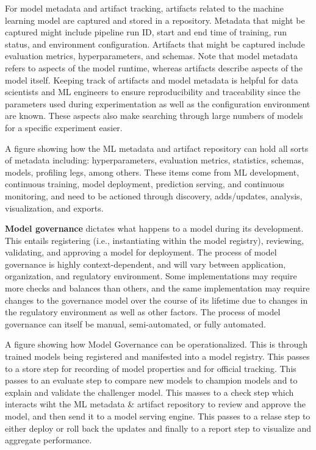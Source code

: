 {{{{{{{{    For model metadata and artifact tracking, artifacts related to the machine learning model are captured and stored in a repository. Metadata that might be captured might include pipeline run  ID, start and end time of training, run status, and environment configuration. Artifacts that might be captured include evaluation metrics, hyperparameters, and schemas. Note that model metadata refers to aspects of the model runtime, whereas artifacts describe aspects of the  model itself. Keeping track of artifacts and model metadata is helpful for data scientists and ML engineers to ensure reproducibility and traceability since the parameters used during experimentation as well as the configuration environment are known. These aspects also make searching through large numbers of models for a specific experiment easier.
    
    
    A figure showing how the ML metadata and artifact repository can hold all sorts of metadata including: hyperparameters, evaluation metrics, statistics, schemas, models, profiling legs, among others. These items come from ML development, continuous training, model deployment, prediction serving, and continuous monitoring, and need to be actioned through discovery, adds/updates, analysis, visualization, and exports.
    
    \textbf{Model governance} dictates what happens to a model during its development. This entails registering (i.e., instantiating within the model registry), reviewing, validating, and approving a model for deployment. The process of model governance is highly context-dependent, and will vary between application, organization, and regulatory environment. Some implementations may require more checks and balances than others, and the same implementation may require changes to the governance model over the course of its lifetime due to changes in the regulatory environment as well as other factors. The process of model governance can itself be manual, semi-automated, or fully automated.
    
        
    A figure showing how Model Governance can be operationalized. This is through trained models being registered and manifested into a model registry. This passes to a store step for recording of model properties and for official tracking. This passes to an evaluate step to compare new models to champion models and to explain and validate the challenger model. This masses to a check step which interacts wiht the ML metadata & artifact repository to review and approve the model, and then send it to a model serving engine. This passes to a relase step to either deploy or roll back the updates and finally to a report step to visualize and aggregate performance.
    
}}}}}}}}
